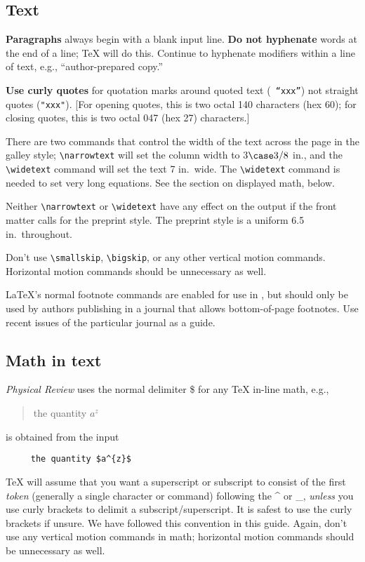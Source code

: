 \subsection{Text}

{\bf Paragraphs} always begin with a blank input line. {\bf Do not
hyphenate} words at the end of a line; \TeX{} will do this.  Continue to
hyphenate modifiers within a line of text, e.g., ``author-prepared copy.''

{\bf Use curly quotes} for quotation marks around quoted text ({\tt
``xxx''}) not straight quotes ({\tt "xxx"}).  [For opening quotes, this is
two octal 140 characters (hex 60); for closing quotes, this is  two octal
047 (hex 27) characters.]

There are two commands that control the width of the text across the page
in the galley style; \verb+\narrowtext+ will set the column width to
3$\case3/8$ in., and the \verb+\widetext+ command will set the text 7 in.\
wide.  The \verb+\widetext+ command is needed to set very long equations.
See the section on displayed math, below.

Neither \verb+\narrowtext+ or \verb+\widetext+ have any effect on the
output if the front matter calls for the preprint style.  The preprint
style is a uniform 6.5 in.\ throughout.

Don't use \verb+\smallskip+, \verb+\bigskip+, or any other vertical motion
commands. Horizontal motion commands should be unnecessary as well.

\LaTeX's normal footnote commands are enabled for use in \REVTeX{}, but
should only be used by authors publishing in a journal that allows
bottom-of-page footnotes.  Use recent issues of the particular journal as a
guide.


\subsection{Math in text}

{\em Physical Review\/} uses the normal delimiter \$ for any \TeX{} in-line
math, e.g.,
\begin{quote}
     {the quantity $a^{z}$}
\end{quote}
is obtained from the input
\begin{verbatim}
     the quantity $a^{z}$
\end{verbatim}

\TeX{} will assume that you want a superscript or subscript to consist of
the first {\em token\/} (generally a single character or command) following
the \^{} or \_, {\em unless\/} you use curly brackets to delimit a
subscript/superscript. It is safest to use the curly brackets if unsure. We
have followed this convention in this guide. Again, don't use any vertical
motion commands in math; horizontal motion commands should be unnecessary
as well.

